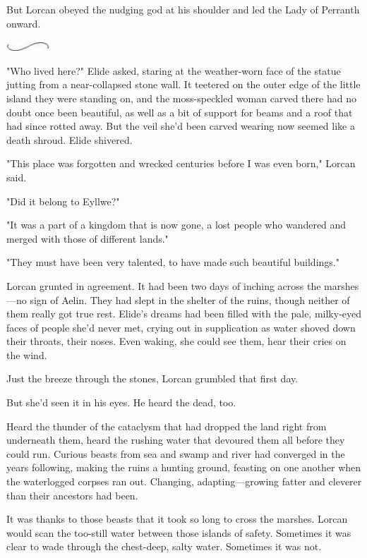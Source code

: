 But Lorcan obeyed the nudging god at his shoulder and led the Lady of Perranth onward.

\includegraphics[width=0.65in,height=0.13in]{images/seperator}

"Who lived here?" Elide asked, staring at the weather-worn face of the statue jutting from a near-collapsed stone wall. It teetered on the outer edge of the little island they were standing on, and the moss-speckled woman carved there had no doubt once been beautiful, as well as a bit of support for beams and a roof that had since rotted away. But the veil she'd been carved wearing now seemed like a death shroud. Elide shivered.

"This place was forgotten and wrecked centuries before I was even born," Lorcan said.

"Did it belong to Eyllwe?"

"It was a part of a kingdom that is now gone, a lost people who wandered and merged with those of different lands."

"They must have been very talented, to have made such beautiful buildings."

Lorcan grunted in agreement. It had been two days of inching across the marshes---no sign of Aelin. They had slept in the shelter of the ruins, though neither of them really got true rest. Elide's dreams had been filled with the pale, milky-eyed faces of people she'd never met, crying out in supplication as water shoved down their throats, their noses. Even waking, she could see them, hear their cries on the wind.

Just the breeze through the stones, Lorcan grumbled that first day.

But she'd seen it in his eyes. He heard the dead, too.

Heard the thunder of the cataclysm that had dropped the land right from underneath them, heard the rushing water that devoured them all before they could run. Curious beasts from sea and swamp and river had converged in the years following, making the ruins a hunting ground, feasting on one another when the waterlogged corpses ran out. Changing, adapting---growing fatter and cleverer than their ancestors had been.

It was thanks to those beasts that it took so long to cross the marshes. Lorcan would scan the too-still water between those islands of safety. Sometimes it was clear to wade through the chest-deep, salty water. Sometimes it was not.

